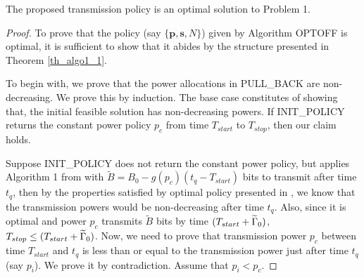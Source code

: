 \begin{theorem}
The proposed transmission policy is an optimal solution to Problem 1.
\label{th_algo1_2}
\end{theorem}
\begin{proof}
To prove that the policy (say $\{\textbf{p},\textbf{s},N\}$) given by Algorithm OPTOFF is optimal, it is sufficient to show that it abides by the structure presented in Theorem \ref{th_algo1_1}.

To begin with, we prove that the power allocations in PULL\_BACK are non-decreasing. We prove this by induction. The base case constitutes of showing that, the initial feasible solution has non-decreasing powers. If INIT\_POLICY returns the constant power policy $p_c$ from time $T_{start}$ to $T_{stop}$, then our claim holds. 

Suppose INIT\_POLICY does not return the constant power policy, but applies Algorithm 1 from \cite{Yang} with $\widetilde{B}=B_0-g(p_c)(t_q-T_{start})$ bits to transmit after time $t_q$, then by the properties satisfied by optimal policy presented in \cite{Yang}, we know that the transmission powers would be non-decreasing after time $t_q$. Also, since it is optimal and power $p_c$ transmits $\widetilde{B}$ bits by time $(T_{start}+\widetilde{\Gamma}_0)$,  $T_{stop}\le (T_{start}+\widetilde{\Gamma}_0)$. Now, we need to prove that transmission power $p_c$ between time $T_{start}$ and $t_q$ is less than or equal to the transmission power just after time $t_q$ (say $p_i$). We prove it by contradiction. Assume that $p_i<p_c$.


\end{proof}
